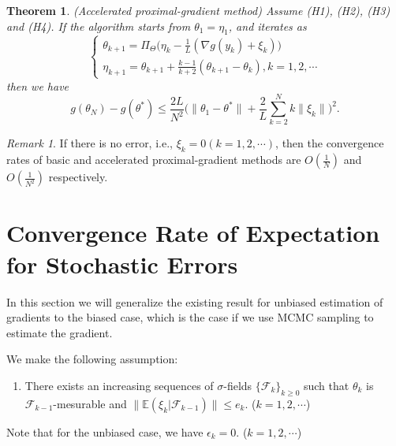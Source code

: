 \documentclass[psamsfonts]{article}
\newtheorem{thm}{Theorem} %
\theoremstyle{definition}
\theoremstyle{remark}
\newtheorem*{rem}{Remark}
\numberwithin{equation} {section}
\begin{document}
\begin{thm}(Accelerated proximal-gradient method)
Assume (H1), (H2), (H3) and (H4). If the algorithm starts from $\theta_1 = \eta_1$, and iterates as
\begin{equation}\label{acc-prox-iteration}
\begin{cases}
\theta_{k+1} = \Pi_\Theta\big(\eta_k - \frac{1}{L}(\nabla g(y_k) + \xi_k)\big)\\
\eta_{k+1} = \theta_{k+1} + \frac{k-1}{k+2}(\theta_{k+1} - \theta_k), k=1, 2, \cdots
\end{cases}
\end{equation}
then we have
\begin{equation}\label{acc-prox-bound}
g(\theta_N) - g(\theta^*) \le \frac{2L}{N^2}\big( \|\theta_1 - \theta^* \|+ \frac{2}{L}\sum_{k=2}^{N} k\|\xi_k\|\big)^2.
\end{equation}
\end{thm}

\begin{rem}
If there is no error, i.e., $\xi_k=0(k=1,2,\cdots)$, then the convergence rates of basic and accelerated proximal-gradient methods are $O(\frac{1}{N})$ and $O(\frac{1}{N^2})$ respectively.
\end{rem}

\section{Convergence Rate of Expectation for Stochastic Errors}

In this section we will generalize the existing result for unbiased estimation of gradients to the biased case, which is the case if we use MCMC sampling to estimate the gradient.

We make the following assumption:
\begin{enumerate}[(H6)]
\item There exists an increasing sequences of $\sigma$-fields $\{\mathcal F_k\}_{k\ge0}$ such that $\theta_k$ is $\mathcal F_{k-1}$-mesurable and $\|\mathbb E(\xi_k|\mathcal F_{k-1}) \| \le e_k$. ($k=1,2,\cdots$)
\end{enumerate}

Note that for the unbiased case, we have $\epsilon_k=0$. ($k=1,2,\cdots$)
\end{document}
